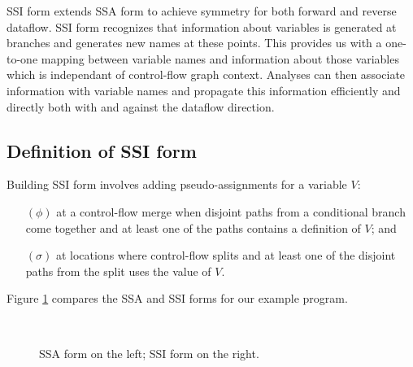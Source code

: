 \documentclass[12pt,notitlepage,twoside]{article}
\begin{document}
SSI form extends SSA form to achieve symmetry for both forward and
reverse dataflow.   SSI form recognizes that information about
variables is generated at branches and generates new names at these
points.  This provides us with a one-to-one mapping between variable
names and information about those variables which is independant of
control-flow graph context.  Analyses can then associate information
with variable names and propagate this information efficiently and
directly both with and against the dataflow direction.

\subsection{Definition of SSI form}
Building SSI form involves adding pseudo-assignments for a variable $V$:
\begin{enumerate}
\item[$(\phi)$] at a control-flow merge when disjoint paths from a
conditional branch come together and at least one of the paths
contains a definition of $V$; and
\item[$(\sigma)$] at locations where control-flow splits and at least
one of the disjoint paths from the split uses the value of $V$.
\end{enumerate}

Figure \ref{fig:tossi} compares the SSA and SSI forms for our example program.
\begin{figure}\label{fig:tossi}
\begin{center}
 \vline\ 
\end{center}
\caption{SSA form on the left; SSI form on the right.}
\end{figure}
\end{document}
